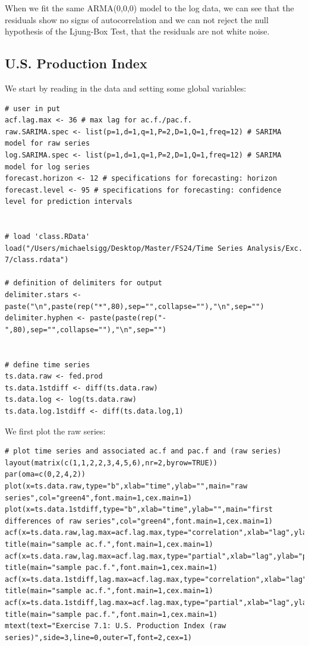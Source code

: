 When we fit the same ARMA(0,0,0) model to the log data, we can see that the residuals show no signs of autocorrelation and we can not reject the null hypothesis of the Ljung-Box Test, that the residuals are not white noise. 

\subsection{U.S. Production Index}


We start by reading in the data and setting some global variables:

\begin{lstlisting}
# user in put
acf.lag.max <- 36 # max lag for ac.f./pac.f.
raw.SARIMA.spec <- list(p=1,d=1,q=1,P=2,D=1,Q=1,freq=12) # SARIMA model for raw series
log.SARIMA.spec <- list(p=1,d=1,q=1,P=2,D=1,Q=1,freq=12) # SARIMA model for log series
forecast.horizon <- 12 # specifications for forecasting: horizon
forecast.level <- 95 # specifications for forecasting: confidence level for prediction intervals


# load 'class.RData'
load("/Users/michaelsigg/Desktop/Master/FS24/Time Series Analysis/Exc. 7/class.rdata")

# definition of delimiters for output
delimiter.stars <- paste("\n",paste(rep("*",80),sep="",collapse=""),"\n",sep="")
delimiter.hyphen <- paste(paste(rep("-",80),sep="",collapse=""),"\n",sep="")


# define time series
ts.data.raw <- fed.prod
ts.data.1stdiff <- diff(ts.data.raw)
ts.data.log <- log(ts.data.raw)
ts.data.log.1stdiff <- diff(ts.data.log,1)
\end{lstlisting}

We first plot the raw series:

\begin{lstlisting}
# plot time series and associated ac.f and pac.f and (raw series)
layout(matrix(c(1,1,2,2,3,4,5,6),nr=2,byrow=TRUE))
par(oma=c(0,2,4,2))
plot(x=ts.data.raw,type="b",xlab="time",ylab="",main="raw series",col="green4",font.main=1,cex.main=1) 
plot(x=ts.data.1stdiff,type="b",xlab="time",ylab="",main="first differences of raw series",col="green4",font.main=1,cex.main=1)
acf(x=ts.data.raw,lag.max=acf.lag.max,type="correlation",xlab="lag",ylab="ac.f.",main="")
title(main="sample ac.f.",font.main=1,cex.main=1)
acf(x=ts.data.raw,lag.max=acf.lag.max,type="partial",xlab="lag",ylab="pac.f.",main="") 
title(main="sample pac.f.",font.main=1,cex.main=1) 
acf(x=ts.data.1stdiff,lag.max=acf.lag.max,type="correlation",xlab="lag",ylab="ac.f.",main="")
title(main="sample ac.f.",font.main=1,cex.main=1)
acf(x=ts.data.1stdiff,lag.max=acf.lag.max,type="partial",xlab="lag",ylab="pac.f.",main="")
title(main="sample pac.f.",font.main=1,cex.main=1)
mtext(text="Exercise 7.1: U.S. Production Index (raw series)",side=3,line=0,outer=T,font=2,cex=1)
\end{lstlisting}

